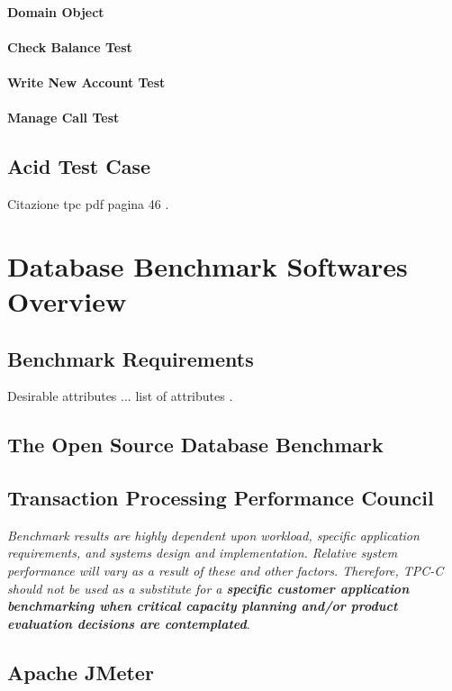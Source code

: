 			\subsubsection{Domain Object}
			\subsubsection{Check Balance Test}
			\subsubsection{Write New Account Test}
			\subsubsection{Manage Call Test}
	\section{Acid Test Case}
Citazione tpc pdf pagina 46 \cite{TPC-C}.

\chapter{Database Benchmark Softwares Overview}
	\section{Benchmark Requirements}
Desirable attributes ... list of attributes \cite{tpc/sigmoid}.
	
	\section{The Open Source Database Benchmark}
	
	\section{Transaction Processing Performance Council}
\emph{Benchmark results are highly dependent upon workload, specific application requirements, and systems design and implementation. Relative system performance will vary as a result of these and other factors. Therefore, TPC-C should not be used as a substitute for a \bfseries{specific customer application} benchmarking when critical capacity planning and/or product evaluation decisions are contemplated}\cite{TPC-C}.
	
	\section{Apache JMeter}
